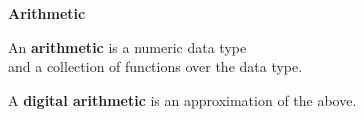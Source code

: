 \begin{frame}

\vspace{\fill}

\begin{center}

\LARGE \textbf{Arithmetic}

\end{center}

\vspace{\fill}

\end{frame}


\begin{frame}

\vspace{\fill}

\begin{center}

An \textbf{arithmetic} is a numeric data type \\ and a collection of functions
over the data type.

\end{center}

\vspace{\fill}

\end{frame}


\begin{frame}

\vspace{\fill}

\begin{center}

A \textbf{digital arithmetic} is an approximation of the above.

\end{center}

\vspace{\fill}

\end{frame}








